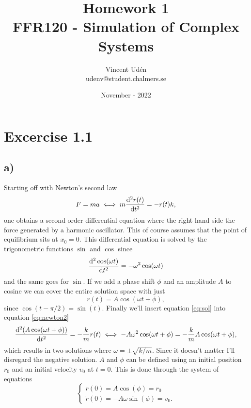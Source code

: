 \documentclass[a4paper, 12pt]{article}
\begin{document}
\title{\vspace{-4cm}Homework 1\\\large{FFR120 - Simulation of Complex Systems}\vspace{-0.7cm}}
\author{Vincent Udén\\udenv@student.chalmers.se}
\date{November - 2022}

\maketitle

\section*{Excercise 1.1}

\subsection*{a)}
Starting off with Newton's second law
\begin{equation} \label{eq:newton2}
    F = ma \iff m \dv[2]{r(t)}{t} = -r(t)k,
\end{equation}
one obtains a second order differential equation where the right hand side the force generated by a harmonic oscillator. This of course assumes that the point of equilibrium sits at $x_0 = 0$. This differential equation is solved by the trigonometric functions $\sin$ and $\cos$ since
\begin{equation}
    \dv[2]{\cos(\omega t)}{t} = -\omega^2 \cos(\omega t)
\end{equation}
and the same goes for $\sin$. If we add a phase shift $\phi$ and an amplitude $A$ to cosine we can cover the entire solution space with just
\begin{equation} \label{eq:sol}
    r(t) = A \cos(\omega t + \phi),
\end{equation}
since $\cos(t - \pi/2) = \sin(t)$. Finally we'll insert equation \eqref{eq:sol} into equation \eqref{eq:newton2}
\begin{equation}
    \dv[2]{(A \cos(\omega t + \phi))}{t} = - \frac{k}{m} r(t) \iff -A \omega^2 \cos(\omega t + \phi) = - \frac{k}{m} A \cos(\omega t + \phi),
\end{equation}
which results in two solutions where $\omega = \pm \sqrt{k/m}$. Since it doesn't matter I'll disregard the negative solution. $A$ and $\phi$ can be defined using an initial position $r_0$ and an initial velocity $v_0$ at $t=0$. This is done through the system of equations
\begin{equation}
    \begin{cases}
        r(0) = A \cos(\phi) = r_0 \\
        \dot{r}(0) = - A \omega \sin(\phi) = v_0.
    \end{cases}
\end{equation}
\end{document}

